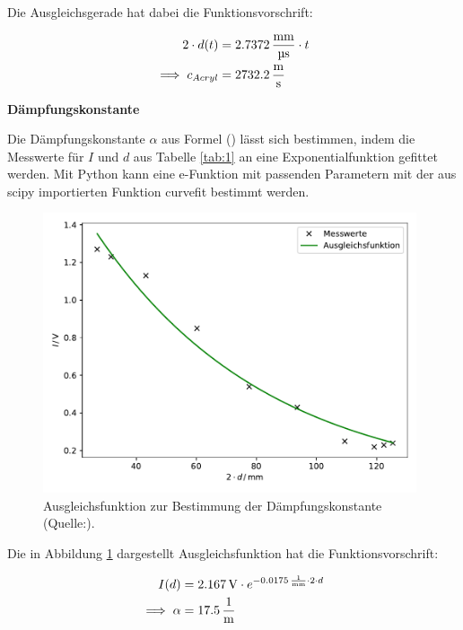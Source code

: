 \noindent
Die Ausgleichsgerade hat dabei die Funktionsvorschrift:

\begin{align*}
2 \cdot d(t) &= 2.7372 \, \si[per-mode=fraction]{\milli\meter\per\micro\second} \cdot t \\
\implies c_{Acryl} &= 2732.2 \, \si[per-mode=fraction]{\meter\per\second} \\
\end{align*}

\noindent
\textbf{Dämpfungskonstante}

\noindent
Die Dämpfungskonstante $\alpha$ aus Formel () lässt sich bestimmen, indem die Messwerte für $I$ und $d$ aus Tabelle \ref{tab:1} an eine Exponentialfunktion gefittet werden.
Mit Python kann eine e-Funktion mit passenden Parametern mit der aus scipy \cite{scipy} importierten Funktion curvefit bestimmt werden.

\begin{figure}
    \centering
    \includegraphics[width=11cm]{Daten/daempf.pdf}
    \caption{Ausgleichsfunktion zur Bestimmung der Dämpfungskonstante (Quelle:\cite{US1}).}
    \label{fig:daempf}
  \end{figure}

  \newpage
\noindent
Die in Abbildung \ref{fig:daempf} dargestellt Ausgleichsfunktion hat die Funktionsvorschrift:

\begin{align*}
I(d) &= 2.167 \, \si{\volt} \cdot e^{-0.0175 \, \si[per-mode=fraction]{\per\milli\meter} \cdot 2 \cdot d}\\
\implies \alpha &= 17.5 \, \si[per-mode=fraction]{\per\meter}\\
\end{align*}


